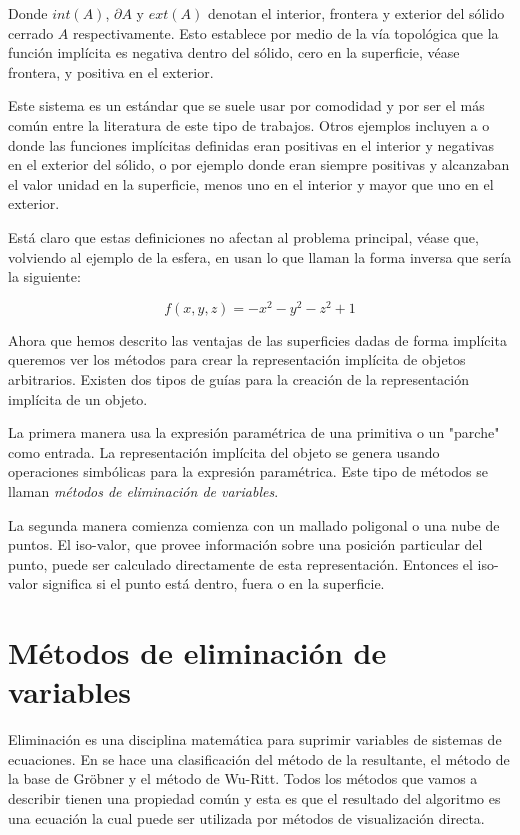 Donde $int(A)$, $\partial A$ y $ext(A)$ denotan el interior, frontera y exterior del sólido cerrado $A$ respectivamente. Esto establece por medio de la vía topológica que la función implícita es negativa dentro del sólido, cero en la superficie, véase frontera, y positiva en el exterior.\cite{Hart01}

Este sistema es un estándar que se suele usar por comodidad y por ser el más común entre la literatura de este tipo de trabajos. Otros ejemplos incluyen a
\cite{Uhlir03} o \cite{Blinn82} donde las funciones implícitas definidas eran positivas en el interior y negativas en el exterior del sólido, o por ejemplo \cite{Ricci73} donde eran siempre positivas y alcanzaban el valor unidad en la superficie, menos uno en el interior y mayor que uno en el exterior.

Está claro que estas definiciones no afectan al problema principal, véase que, volviendo al ejemplo de la esfera, en \cite{Uhlir03} usan lo que llaman la forma inversa que sería la siguiente:

$$f(x,y,z) = - x^2 - y^2 - z^2 + 1$$

Ahora que hemos descrito las ventajas de las superficies dadas de forma implícita queremos ver los métodos para crear la representación implícita de objetos arbitrarios. Existen dos tipos de guías para la creación de la representación implícita de un objeto.

La primera manera usa la expresión paramétrica  de una primitiva o un "parche" como entrada. La representación implícita del objeto se genera usando operaciones simbólicas para la expresión paramétrica. Este tipo de métodos se llaman { \em métodos de eliminación de variables}.

La segunda manera comienza comienza con un mallado poligonal o una nube de puntos. El iso-valor, que provee información sobre una posición particular del punto, puede ser calculado directamente de esta representación. Entonces el iso-valor significa si el punto está dentro, fuera o en la superficie.

\section{Métodos de eliminación de variables}

Eliminación es una disciplina matemática para suprimir variables de sistemas de ecuaciones. En \cite{Hoffmann93} se hace una clasificación del método de la resultante, el método de la base de Gröbner y el método de Wu-Ritt. Todos los métodos que vamos a describir tienen una propiedad común y esta es que el resultado del algoritmo es una ecuación la cual puede ser utilizada por métodos de visualización directa.

